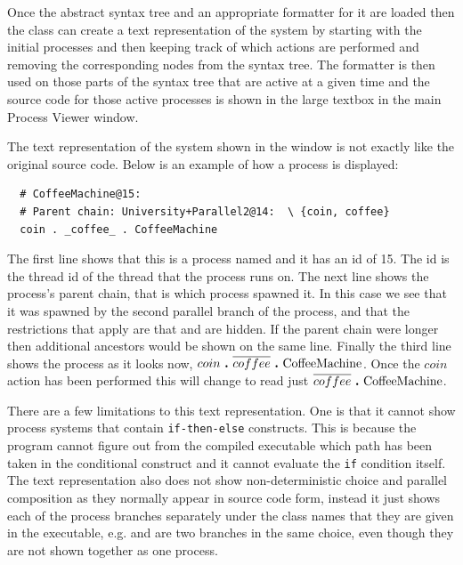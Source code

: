 	Once the abstract syntax tree and an appropriate formatter for it are loaded
	then the  class can create a text 
	representation of the system by starting with the initial processes and 
	then keeping track of which actions are performed and removing the 
	corresponding nodes from the syntax tree. The formatter is then used on those
	parts of the syntax tree that are active at a given time and the source
	code for those active processes is shown in the large textbox in the main 
	Process Viewer window.
	
	The text representation of the system shown in the window is not exactly 
	like the original source code. Below is an example of how a process is 
	displayed:
	
	
	\begin{verbatim}
  # CoffeeMachine@15: 
  # Parent chain: University+Parallel2@14:  \ {coin, coffee}
  coin . _coffee_ . CoffeeMachine
	\end{verbatim}
	
	The first line shows that this is a process named  and it
	has an id of 15. The id is the thread id of the thread that the process runs 
	on. The next line shows the process's parent chain, that is which process 
	spawned it. In this case we see that it was spawned by the second parallel 
	branch of the  process, and that the restrictions that apply
	are that  and  are hidden. If the parent chain 
	were longer then additional ancestors would be shown on the same line. 
	Finally the third line shows the process as it looks now, $coin \ \textbf{.}\  
	\overline{coffee} \ \textbf{.}\  \mathrm{CoffeeMachine}$. Once the $coin$ action 
	has been performed this will change to read just $\overline{coffee} \ \textbf{.}\  
	\mathrm{CoffeeMachine}$. 
	
	There are a few limitations to this text representation. One is that 
	it cannot show process systems that contain \texttt{if-then-else} 
	constructs. This is because the program cannot figure out from the compiled 
	executable which path has been taken in the conditional construct and it 
	cannot evaluate the \texttt{if} condition itself. The text representation 
	also does not show non-deterministic choice and parallel composition as they 
	normally appear in source code form, instead it just shows each of the 
	process branches separately under the class names that they are given in
	the executable, e.g.  and 
	 are two branches in the same choice, even though 
	they are not shown together as one process.

